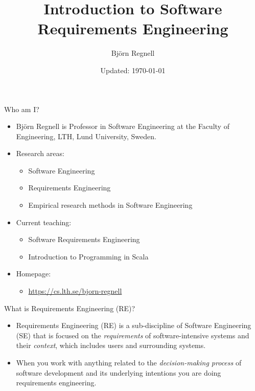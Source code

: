 \documentclass{beamer}
\author{Björn Regnell}
\title{Introduction to Software\\Requirements Engineering}
\date{\footnotesize Updated: \today}
\begin{document}
\maketitle

\begin{frame}[fragile]{Who am I?}
\begin{itemize}
\item Björn Regnell is Professor in Software Engineering at the Faculty of Engineering, LTH, Lund University, Sweden.
\item Research areas: 
\begin{itemize}
\item Software Engineering
\item Requirements Engineering 
\item Empirical research methods in Software Engineering 
\end{itemize}
\item Current teaching: 
\begin{itemize}
  \item Software Requirements Engineering
  \item Introduction to Programming in Scala 
\end{itemize}
\item Homepage: 
\begin{itemize}
\item \url{https://cs.lth.se/bjorn-regnell}
\end{itemize}
\end{itemize}
\end{frame}

\begin{frame}[fragile]{What is Requirements Engineering (RE)?}
\begin{itemize}
\item  Requirements Engineering (RE) is a sub-discipline of Software Engineering (SE) that is focused on the \textit{requirements} of software-intensive systems and their \textit{context}, which includes users and surrounding systems.
\item When you work with anything related to the \textit{decision-making process} of software development and its underlying intentions you are doing requirements engineering.
\end{itemize}
\end{frame}
\end{document}
